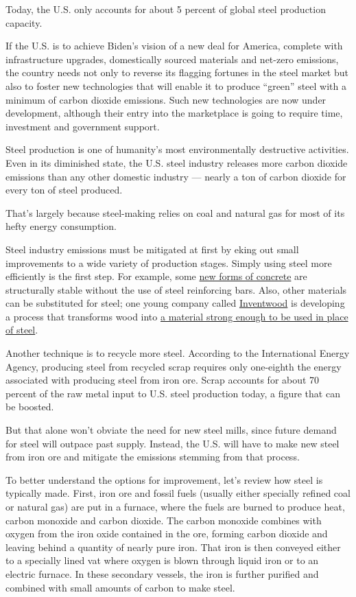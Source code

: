 \documentclass[
]{book}
\begin{document}
Today, the U.S. only accounts for about 5 percent of global steel production capacity.

If the U.S. is to achieve Biden's vision of a new deal for America, complete with infrastructure upgrades, domestically sourced materials and net-zero emissions, the country needs not only to reverse its flagging fortunes in the steel market but also to foster new technologies that will enable it to produce ``green'' steel with a minimum of carbon dioxide emissions. Such new technologies are now under development, although their entry into the marketplace is going to require time, investment and government support.

Steel production is one of humanity's most environmentally destructive activities. Even in its diminished state, the U.S. steel industry releases more carbon dioxide emissions than any other domestic industry --- nearly a ton of carbon dioxide for every ton of steel produced.

That's largely because steel-making relies on coal and natural gas for most of its hefty energy consumption.

Steel industry emissions must be mitigated at first by eking out small improvements to a wide variety of production stages. Simply using steel more efficiently is the first step. For example,
some \href{https://energycentral.com/c/ec/new-innovation-drives-down-carbon-dioxide-emissions-cement}{new forms of concrete} are structurally stable without the use of steel reinforcing bars. Also, other materials can be substituted for steel;
one young company called \href{https://www.inventwood.com/}{Inventwood} is developing a process that transforms wood into \href{https://www.inventwood.com/mettlewood/}{a material strong enough to be used in place of steel}.

Another technique is to recycle more steel. According to the International Energy Agency, producing steel from recycled scrap requires only one-eighth the energy associated with producing steel from iron ore. Scrap accounts for about 70 percent of the raw metal input to U.S. steel production today, a figure that can be boosted.

But that alone won't obviate the need for new steel mills, since future demand for steel will outpace past supply. Instead, the U.S. will have to make new steel from iron ore and mitigate the emissions stemming from that process.

To better understand the options for improvement, let's review how steel is typically made. First, iron ore and fossil fuels (usually either specially refined coal or natural gas) are put in a furnace, where the fuels are burned to produce heat, carbon monoxide and carbon dioxide. The carbon monoxide combines with oxygen from the iron oxide contained in the ore, forming carbon dioxide and leaving behind a quantity of nearly pure iron. That iron is then conveyed either to a specially lined vat where oxygen is blown through liquid iron or to an electric furnace. In these secondary vessels, the iron is further purified and combined with small amounts of carbon to make steel.
\end{document}
